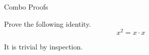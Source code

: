 \documentclass[11pt,letterpaper,boxed]{hmcpset}
\begin{document}
\begin{center}
    \LARGE{Combo Proofs}
\end{center}


\begin{problem}
    Prove the following identity.
    $$x^2=x\cdot x$$
\end{problem}

\begin{solution}
    It is trivial by inspection.
\end{solution}

\newpage
\end{document}
